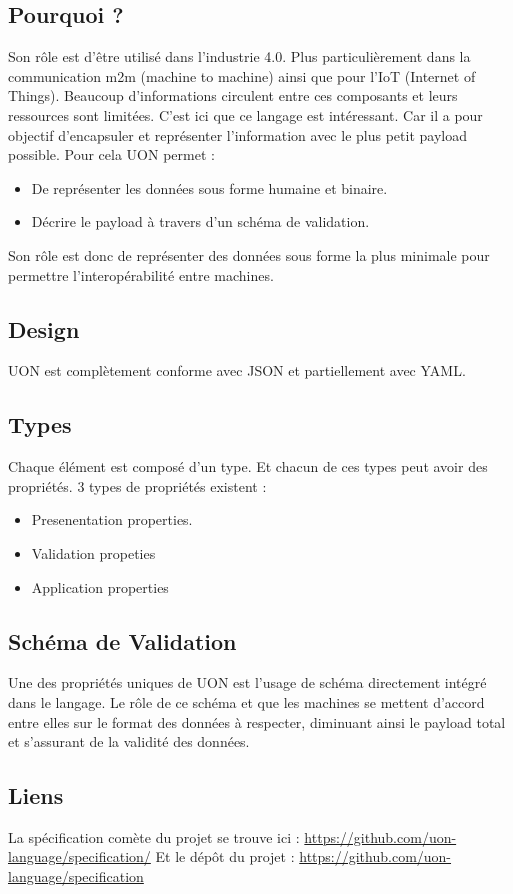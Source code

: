 \documentclass[
    iict, %
    il, %
]{heig-tb}
\begin{document}
\subsection{Pourquoi ?}
Son rôle est d’être utilisé dans l’industrie 4.0. Plus particulièrement dans la communication m2m (machine to machine) ainsi que pour l’IoT (Internet of Things).
Beaucoup d’informations circulent entre ces composants et leurs ressources sont limitées.
C’est ici que ce langage est intéressant. Car il a pour objectif d’encapsuler et représenter l’information avec le plus petit payload possible.
Pour cela UON permet :
\begin{itemize}
    \item De représenter les données sous forme humaine et binaire.
    \item Décrire le payload à travers d’un schéma de validation.
\end{itemize}
Son rôle est donc de représenter des données sous forme la plus minimale pour permettre l'interopérabilité entre machines.

\subsection{Design}
UON est complètement conforme avec JSON et partiellement avec YAML.

\subsection{Types}
Chaque élément est composé d’un type. Et chacun de ces types peut avoir des propriétés.
3 types de propriétés existent :
\begin{itemize}
    \item Presenentation properties.
    \item Validation propeties
    \item Application properties
\end{itemize}

\subsection{Schéma de Validation}
Une des propriétés uniques de UON est l’usage de schéma directement intégré dans le langage.
Le rôle de ce schéma et que les machines se mettent d’accord entre elles sur le format des données à respecter, diminuant ainsi le payload total et s’assurant de la validité des données.

\subsection{Liens}
La spécification comète du projet se trouve ici : \href{https://github.com/uon-language/specification/}{https://github.com/uon-language/specification/}
Et le dépôt du projet : \href{https://github.com/uon-language/specification}{https://github.com/uon-language/specification}
\end{document}
